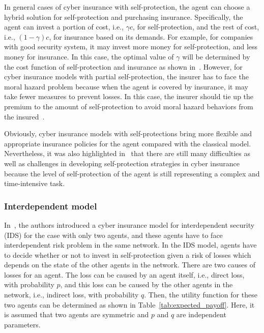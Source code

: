 \documentclass[twocolumn,10pt]{IEEEtran}
\begin{document}
In general cases of cyber insurance with self-protection, the agent can choose a hybrid solution for self-protection and purchasing insurance. Specifically, the agent can invest a portion of cost, i.e., $\gamma c$, for self-protection, and the rest of cost, i.e., $(1-\gamma) c$, for insurance based on its demands. For example, for companies with good security system, it may invest more money for self-protection, and less money for insurance. In this case, the optimal value of $\gamma$ will be determined by the cost function of self-protection and insurance as shown in~\cite{Bolot2008Cyber}. However, for cyber insurance models with partial self-protection, the insurer has to face the moral hazard problem because when the agent is covered by insurance, it may take fewer measures to prevent losses. In this case, the insurer should tie up the premium to the amount of self-protection to avoid moral hazard behaviors from the insured~\cite{Ehrlich1972Market}. 

Obviously, cyber insurance models with self-protections bring more flexible and appropriate insurance policies for the agent compared with the classical model. Nevertheless, it was also highlighted in~\cite{Bolot2008Cyber} that there are still many difficulties as well as challenges in developing self-protection strategies in cyber insurance because the level of self-protection of the agent is still representing a complex and time-intensive task. 

\subsubsection{Interdependent model}

In~\cite{Kunreuther2003Interdependet}, the authors introduced a cyber insurance model for interdependent security (IDS) for the case with only two agents, and these agents have to face interdependent risk problem in the same network. In the IDS model, agents have to decide whether or not to invest in self-protection given a risk of losses which depends on the state of the other agents in the network. There are two causes of losses for an agent. The loss can be caused by an agent itself, i.e., direct loss, with probability $p$, and this loss can be caused by the other agents in the network, i.e., indirect loss, with probability $q$. Then, the utility function for these two agents can be determined as shown in Table~\ref{tab:expected_payoff}. Here, it is assumed that two agents are symmetric and $p$ and $q$ are independent parameters. 
\end{document}
